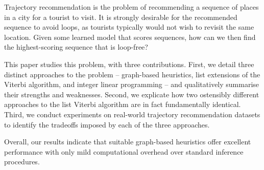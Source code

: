 
Trajectory recommendation is the problem of recommending a sequence of places in a city for a tourist to visit.
It is strongly desirable for the recommended sequence to avoid loops, as tourists typically would not wish to revisit the same location.
Given some learned model that scores sequences, how can we then find the highest-scoring sequence that is loop-free?

This paper studies this problem, with three contributions.
First, we detail three distinct approaches to the problem -- 
graph-based heuristics,
list extensions of the Viterbi algorithm,
and integer linear programming
-- and qualitatively summarise their strengths and weaknesses.
Second, we explicate how two ostensibly different approaches to the list Viterbi algorithm \citep{seshadri1994list,nilsson2001sequentially} are in fact fundamentally identical.
Third, we conduct experiments on real-world trajectory recommendation datasets to identify the tradeoffs imposed by each of the three approaches.

Overall, our results indicate that suitable graph-based heuristics offer excellent performance with only mild computational overhead over standard inference procedures.

